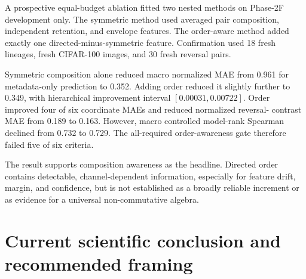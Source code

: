 \documentclass[11pt,a4paper]{article}
\begin{document}
A prospective equal-budget ablation fitted two nested methods on Phase-2F
development only.  The symmetric method used averaged pair composition,
independent retention, and envelope features.  The order-aware method added
exactly one directed-minus-symmetric feature.  Confirmation used 18 fresh
lineages, fresh CIFAR-100 images, and 30 fresh reversal pairs.

Symmetric composition alone reduced macro normalized MAE from 0.961 for
metadata-only prediction to 0.352.  Adding order reduced it slightly further
to 0.349, with hierarchical improvement interval $[0.00031,0.00722]$.
Order improved four of six coordinate MAEs and reduced normalized reversal-
contrast MAE from 0.189 to 0.163.  However, macro controlled model-rank
Spearman declined from 0.732 to 0.729.  The all-required order-awareness gate
therefore failed five of six criteria.

The result supports composition awareness as the headline.  Directed order
contains detectable, channel-dependent information, especially for feature
drift, margin, and confidence, but is not established as a broadly reliable
increment or as evidence for a universal non-commutative algebra.

\section{Current scientific conclusion and recommended framing}
\end{document}

